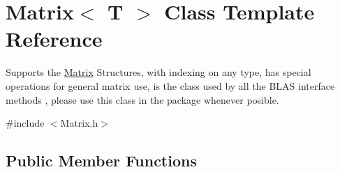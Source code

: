 \hypertarget{singletonMatrix}{}\section{Matrix$<$ T $>$ Class Template Reference}
\label{singletonMatrix}


Supports the \hyperlink{singletonMatrix}{Matrix} Structures, with indexing on any type, has special operations for general matrix use, is the class used by all the B\+L\+A\+S interface methods , please use this class in the package whenever posible.  




{\ttfamily \#include $<$Matrix.\+h$>$}

\subsection*{Public Member Functions}
